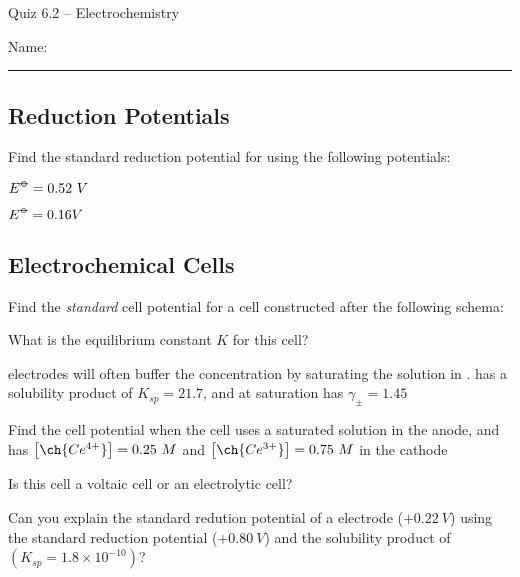 \documentclass[11pt, letterpaper]{memoir}
\begin{document}
	\begin{center}
		{\large Quiz 6.2 -- Electrochemistry}
	\end{center}
	{\large Name: \rule[-1mm]{4in}{.1pt} 


\subsection*{Reduction Potentials}

Find the standard reduction potential for  using the following potentials:

 \hspace{2em}$E^{\std} = 0.52~V$

 \hspace{2em}$E^{\std} = 0.16V$

\vspace{3em}
\subsection*{Electrochemical Cells}
Find the \emph{standard} cell potential for a cell constructed after the following schema:


\vspace{3em}\noindent
What is the equilibrium constant $K$ for this cell?

\vspace{3em}\noindent
{} electrodes will often buffer the  concentration by saturating the solution in .  has a solubility product of $K_{sp}=21.7$, and at saturation  has $\gamma_{\pm}=1.45$
 
\noindent Find the cell potential when the cell uses a saturated  solution in the anode, and has $\left[\ch{Ce^{4+}}\right]=0.25~M$ and $\left[\ch{Ce^{3+}}\right]=0.75~M$ in the cathode

\vspace{6em}\noindent
Is this cell a voltaic cell or an electrolytic cell?

\vspace{3em}\noindent
Can you explain the standard redution potential of a  electrode ($+0.22~V$) using the  standard reduction potential ($+0.80~V$) and the solubility product of  $\left(K_{sp}=1.8\times10^{-10}\right)$?

\newpage
\pagestyle{empty}
\addtocounter{page}{-1}	
}
\end{document}
